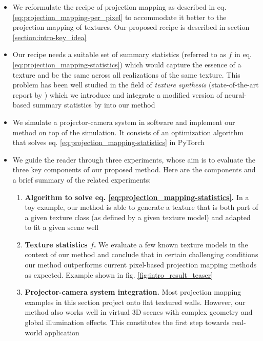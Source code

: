 \begin{itemize}
    \item We reformulate the recipe of projection mapping as described in eq. \ref{eq:projection_mapping-per_pixel} to accommodate it better to the projection mapping of textures. Our proposed recipe is described in section \ref{section:intro-key_idea}
    \item Our recipe needs a suitable set of summary statistics (referred to as \(f\) in eq. \ref{eq:projection_mapping-statistics}) which would capture the essence of a texture and be the same across all realizations of the same texture. This problem has been well studied in the field of \textit{texture synthesis} (state-of-the-art report by \citet{Raad2018}) which we introduce and integrate a modified version of neural-based summary statistics by \citet{Gatys2015} into our method
    \item We simulate a projector-camera system in software and implement our method on top of the simulation. It consists of an optimization algorithm that solves eq. \ref{eq:projection_mapping-statistics} in PyTorch
    \item We guide the reader through three experiments, whose aim is to evaluate the three key components of our proposed method. Here are the components and a brief summary of the related experiments:
    \begin{enumerate}
        \item \textbf{Algorithm to solve eq. \ref{eq:projection_mapping-statistics}.} In a toy example, our method is able to generate a texture that is both part of a given texture class (as defined by a given texture model) and adapted to fit a given scene well
        \item \textbf{Texture statistics \(f\).} We evaluate a few known texture models in the context of our method and conclude that in certain challenging conditions our method outperforms current pixel-based projection mapping methods as expected. Example shown in fig. \ref{fig:intro_result_teaser}
        \item \textbf{Projector-camera system integration.} Most projection mapping examples in this section project onto flat textured walls. However, our method also works well in virtual 3D scenes with complex geometry and global illumination effects. This constitutes the first step towards real-world application
    \end{enumerate}
\end{itemize}

